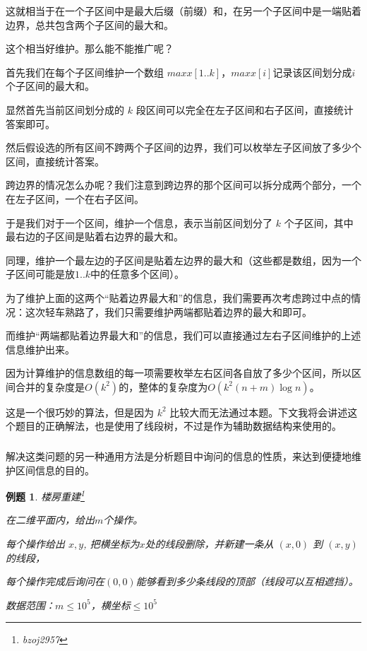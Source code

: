 \documentclass[a4paper]{article}
\newcommand{\kai}{\CJKfamily{kai}}
\newtheorem{problem}{例题}
\begin{document}
这就相当于在一个子区间中是最大后缀（前缀）和，在另一个子区间中是一端贴着边界，总共包含两个子区间的最大和。

这个相当好维护。那么能不能推广呢？

首先我们在每个子区间维护一个数组 $maxx[1..k]$，$maxx[i]$记录该区间划分成$i$个子区间的最大和。

显然首先当前区间划分成的 $k$ 段区间可以完全在左子区间和右子区间，直接统计答案即可。

然后假设选的所有区间不跨两个子区间的边界，我们可以枚举左子区间放了多少个区间，直接统计答案。

跨边界的情况怎么办呢？我们注意到跨边界的那个区间可以拆分成两个部分，一个在左子区间，一个在右子区间。

于是我们对于一个区间，维护一个信息，表示当前区间划分了 $k$ 个子区间，其中最右边的子区间是贴着右边界的最大和。

同理，维护一个最左边的子区间是贴着左边界的最大和（这些都是数组，因为一个子区间可能是放$1..k$中的任意多个区间）。

为了维护上面的这两个“贴着边界最大和”的信息，我们需要再次考虑跨过中点的情况：这次轻车熟路了，我们只需要维护两端都贴着边界的最大和即可。

而维护“两端都贴着边界最大和”的信息，我们可以直接通过左右子区间维护的上述信息维护出来。

因为计算维护的信息数组的每一项需要枚举左右区间各自放了多少个区间，所以区间合并的复杂度是$O(k^2)$的，整体的复杂度为$O(k^2(n+m)\log n)$。

这是一个很巧妙的算法，但是因为 $k^2$ 比较大而无法通过本题。下文我将会讲述这个题目的正确解法，也是使用了线段树，不过是作为辅助数据结构来使用的。

\subsubsection{\kai{分析题目性质}}

解决这类问题的另一种通用方法是分析题目中询问的信息的性质，来达到便捷地维护区间信息的目的。

\begin{problem}
  楼房重建\footnote{bzoj2957}

  在二维平面内，给出$m$个操作。

  每个操作给出 $x,y$, 把横坐标为$x$处的线段删除，并新建一条从 $(x,0)$ 到 $(x,y)$ 的线段，

  每个操作完成后询问在$(0,0)$能够看到多少条线段的顶部（线段可以互相遮挡）。

  数据范围：$m\leq 10^5$，横坐标$\leq 10^5$
\end{problem}
\end{document}
